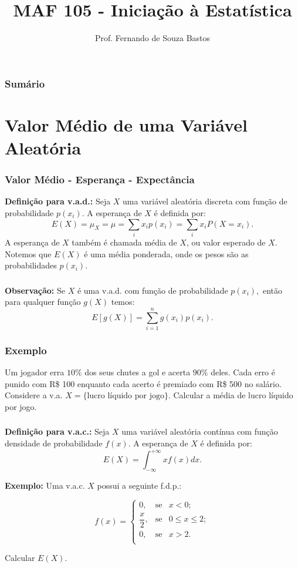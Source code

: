 \documentclass[14pt,aspectratio=1610]{beamer}
\title{MAF 105 - Iniciação à Estatística}
\author{Prof. Fernando de Souza Bastos}
\institute{Instituto de Ciências Exatas e Tecnológicas\texorpdfstring{\\ Universidade Federal de Viçosa}{}\texorpdfstring{\\ Campus UFV - Florestal}{}}
\date[\today]{}
\begin{document}


\frame{\titlepage}

\begin{frame}{}
\frametitle{\bf Sumário}
\tableofcontents
\end{frame}

\section{Valor Médio de uma Variável Aleatória}
\begin{frame}{}
\frametitle{Valor Médio - Esperança - Expectância}
\begin{block}{}
\justifying
\textbf{Definição para v.a.d.:} Seja $X$ uma variável aleatória discreta com função de probabilidade $p(x_{i})$. A esperança de $X$ é definida por: 
$$\displaystyle E(X)=\mu_{X}=\mu=\sum_{i}x_{i}p(x_{i})=\sum_{i}x_{i}P(X=x_{i}).$$ A esperança de $X$ também é chamada média de $X$, ou valor esperado de $X$. 
Notemos que $E(X)$ é uma média ponderada, onde os pesos são as probabilidades $p(x_{i}).$
\end{block}
\end{frame}

\begin{frame}{}
\frametitle{}
\begin{block}{}
\justifying
\textbf{Observação:} Se $X$ é uma v.a.d. com função de probabilidade $p(x_{i}),$ então para qualquer função $g(X)$ temos: 
$$\displaystyle E[g(X)]=\sum_{i=1}^{n}g(x_{i})p(x_{i}).$$
\end{block}
\end{frame}

\begin{frame}{}
\frametitle{Exemplo}
\begin{block}{}
\justifying
Um jogador erra $10\%$ dos seus chutes a gol e acerta $90\%$ deles. Cada erro é punido com R\$ 100 enquanto cada acerto é premiado com R\$ 500 no salário. 
Considere a v.a. $X=\{\textrm{lucro líquido por jogo}\}.$ Calcular a média de lucro líquido por jogo.
\end{block}
\end{frame}

\begin{frame}{}
\frametitle{}
\begin{block}{}
\justifying
\textbf{Definição para v.a.c.:} Seja $X$ uma variável aleatória contínua com função densidade de probabilidade $f(x)$. A esperança de $X$ é definida por: 
$$\displaystyle E(X)=\int_{-\infty}^{+\infty}xf(x)dx.$$

\textbf{Exemplo:} Uma v.a.c. $X$ possui a seguinte f.d.p.:

$$
f(x)=\left\{
\begin{array}{ccccc}
0,           & \textrm{se} & x<0     ;\\
\dfrac{x}{2},& \textrm{se} & 0\leq x\leq 2;\\
0,           & \textrm{se} & x> 2 .\\
\end{array}
\right.
$$

Calcular $E(X).$

\end{block}
\end{frame}
\end{document}
